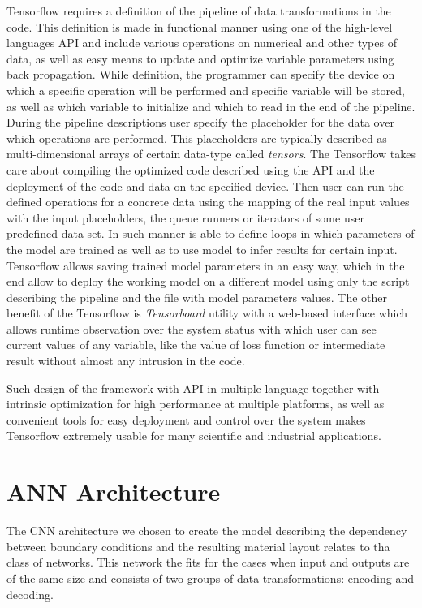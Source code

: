 Tensorflow requires a definition of the pipeline of data transformations in the code.
This definition is made in functional manner using one of the high-level languages API and include various operations on numerical and other types of data, as well as easy means to update and optimize variable parameters using back propagation. 
While definition, the programmer can specify the device on which a specific operation will be performed and specific variable will be stored, as well as which variable to initialize and which to read in the end of the pipeline. 
During the pipeline descriptions user specify the placeholder for the data over which operations are performed. 
This placeholders are typically described as multi-dimensional arrays of certain data-type called \textit{tensors}.
The Tensorflow takes care about compiling the optimized code described using the API and the deployment of the code and data on the specified device. 
Then user can run the defined operations for a concrete data using the mapping of the real input values with the input placeholders, the queue runners or iterators of some user predefined data set.
In such manner is able to define loops in which parameters of the model are trained as well as to use model to infer results for certain input.
Tensorflow allows saving trained model parameters in an easy way, which in the end allow to deploy the working model on a different model using only the script describing the pipeline and the file with model parameters values.
The other benefit of the Tensorflow is \textit{Tensorboard} utility with a web-based interface which allows runtime observation over the system status with which user can see current values of any variable, like the value of loss function or intermediate result without almost any intrusion in the code.
\medskip

Such design of the framework with API in multiple language together with intrinsic optimization for high performance at multiple platforms, as well as convenient tools for easy deployment and control over the system makes Tensorflow extremely usable for many scientific and industrial applications.


\section{ANN Architecture}

The CNN architecture we chosen to create the model describing the dependency between boundary conditions and the resulting material layout relates to tha class of  networks.
This network the fits for the cases when input and outputs are of the same size and consists of two groups of data transformations: encoding and decoding.

